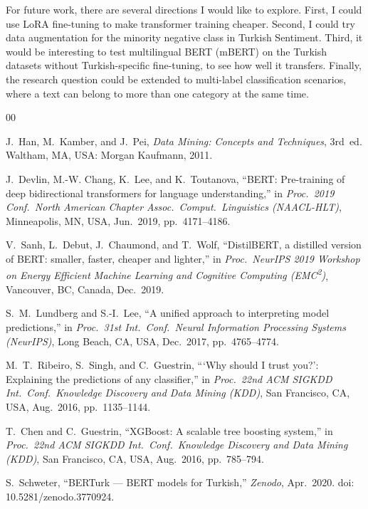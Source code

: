 \documentclass[conference]{IEEEtran}
\begin{document}
For future work, there are several directions I would like to explore. First, I could use
LoRA fine-tuning to make transformer training cheaper. Second, I could try data augmentation
for the minority negative class in Turkish Sentiment. Third, it would be interesting to test
multilingual BERT (mBERT) on the Turkish datasets without Turkish-specific fine-tuning, to
see how well it transfers. Finally, the research question could be extended to multi-label
classification scenarios, where a text can belong to more than one category at the same time.

\begin{thebibliography}{00}

J.~Han, M.~Kamber, and J.~Pei,
\textit{Data Mining: Concepts and Techniques}, 3rd~ed.
Waltham, MA, USA: Morgan Kaufmann, 2011.

J.~Devlin, M.-W. Chang, K.~Lee, and K.~Toutanova,
``BERT: Pre-training of deep bidirectional transformers for language understanding,''
in \textit{Proc.\ 2019 Conf.\ North American Chapter Assoc.\ Comput.\ Linguistics (NAACL-HLT)},
Minneapolis, MN, USA, Jun.\ 2019, pp.~4171--4186.

V.~Sanh, L.~Debut, J.~Chaumond, and T.~Wolf,
``DistilBERT, a distilled version of BERT: smaller, faster, cheaper and lighter,''
in \textit{Proc.\ NeurIPS 2019 Workshop on Energy Efficient Machine Learning and Cognitive Computing (EMC\textsuperscript{2})},
Vancouver, BC, Canada, Dec.\ 2019.

S.~M.~Lundberg and S.-I.~Lee,
``A unified approach to interpreting model predictions,''
in \textit{Proc.\ 31st Int.\ Conf.\ Neural Information Processing Systems (NeurIPS)},
Long Beach, CA, USA, Dec.\ 2017, pp.~4765--4774.

M.~T.~Ribeiro, S.~Singh, and C.~Guestrin,
```Why should I trust you?': Explaining the predictions of any classifier,''
in \textit{Proc.\ 22nd ACM SIGKDD Int.\ Conf.\ Knowledge Discovery and Data Mining (KDD)},
San Francisco, CA, USA, Aug.\ 2016, pp.~1135--1144.

T.~Chen and C.~Guestrin,
``XGBoost: A scalable tree boosting system,''
in \textit{Proc.\ 22nd ACM SIGKDD Int.\ Conf.\ Knowledge Discovery and Data Mining (KDD)},
San Francisco, CA, USA, Aug.\ 2016, pp.~785--794.

S.~Schweter,
``BERTurk --- BERT models for Turkish,''
\textit{Zenodo}, Apr.\ 2020.
doi: 10.5281/zenodo.3770924.


\end{thebibliography}
\end{document}
